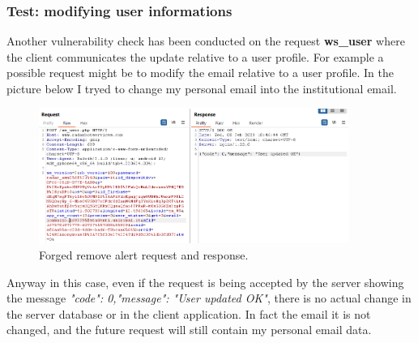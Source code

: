 		\subsubsection{Test: modifying user informations}
			\par Another vulnerability check has been conducted on the request \textbf{ws\_user} where the client communicates the update relative to a user profile. For example a possible request might be to modify the email relative to a user profile. In the picture below I tryed to change my personal email into the institutional email.
			\begin{figure}[h]
				\centering
				\includegraphics[width=0.9\textwidth]{images/radarbot_changeemail.png}
				\caption{Forged remove alert request and response.}
			\end{figure}
			\par Anyway in this case, even if the request is being accepted by the server showing the message \textit{"code": 0,"message": "User updated OK"}, there is no actual change in the server database or in the client application. In fact the email it is not changed, and the future request will still contain my personal email data.
